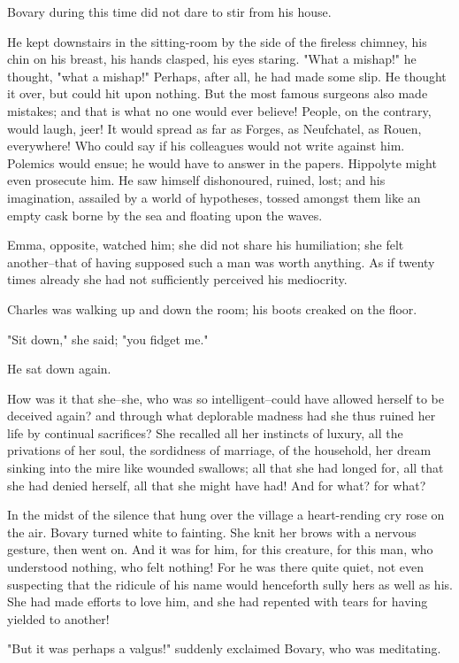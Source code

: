 \documentclass[11pt,twocolumn]{ltugboat}
\begin{document}
Bovary during this time did not dare to stir from his house.

He kept downstairs in the sitting-room by the side of the fireless
chimney, his chin on his breast, his hands clasped, his eyes staring.
"What a mishap!" he thought, "what a mishap!" Perhaps, after all, he had
made some slip. He thought it over, but could hit upon nothing. But the
most famous surgeons also made mistakes; and that is what no one would
ever believe! People, on the contrary, would laugh, jeer! It would
spread as far as Forges, as Neufchatel, as Rouen, everywhere! Who could
say if his colleagues would not write against him. Polemics would ensue;
he would have to answer in the papers. Hippolyte might even prosecute
him. He saw himself dishonoured, ruined, lost; and his imagination,
assailed by a world of hypotheses, tossed amongst them like an empty
cask borne by the sea and floating upon the waves.

Emma, opposite, watched him; she did not share his humiliation; she felt
another--that of having supposed such a man was worth anything. As if
twenty times already she had not sufficiently perceived his mediocrity.

Charles was walking up and down the room; his boots creaked on the
floor.

"Sit down," she said; "you fidget me."

He sat down again.

How was it that she--she, who was so intelligent--could have allowed
herself to be deceived again? and through what deplorable madness had
she thus ruined her life by continual sacrifices? She recalled all her
instincts of luxury, all the privations of her soul, the sordidness of
marriage, of the household, her dream sinking into the mire like wounded
swallows; all that she had longed for, all that she had denied herself,
all that she might have had! And for what? for what?

In the midst of the silence that hung over the village a heart-rending
cry rose on the air. Bovary turned white to fainting. She knit her
brows with a nervous gesture, then went on. And it was for him, for this
creature, for this man, who understood nothing, who felt nothing! For he
was there quite quiet, not even suspecting that the ridicule of his name
would henceforth sully hers as well as his. She had made efforts to love
him, and she had repented with tears for having yielded to another!

"But it was perhaps a valgus!" suddenly exclaimed Bovary, who was
meditating.
\end{document}
